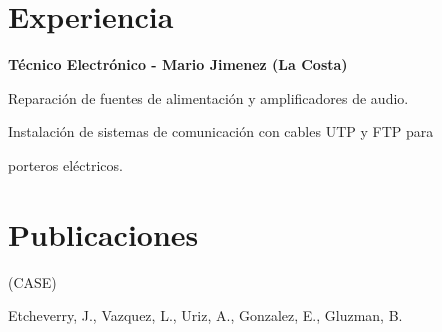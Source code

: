 \documentclass[a4paper,10pt]{article}
\begin{document}
\begin{adjustbox}{valign=t}
\begin{minipage}{0.60\textwidth}

\section*{Experiencia}
\begin{description}
\raggedright

\item[ \textcolor{ColorOne}{2015-2019}] 
	\textbf{Técnico Electrónico - Mario Jimenez (La Costa)}\\ \Myskip
	\item \justifying	Reparación de fuentes de alimentación y amplificadores de audio.
	\item \justifying Instalación de sistemas de comunicación con cables UTP y FTP para \item porteros eléctricos. \MySkip	 	
\end{description}
\section*{Publicaciones}
\begin{description}
\raggedright

\item[ \textcolor{ColorOne}{Nov.2021}] 
	 (CASE) \Myskip
    \item Etcheverry, J., Vazquez, L., Uriz, A., Gonzalez, E., Gluzman, B.\MySkip
\end{description}

 
%
	

\begin{multicols}{2}

\end{multicols}
\end{minipage}
\end{adjustbox}
\end{document}
